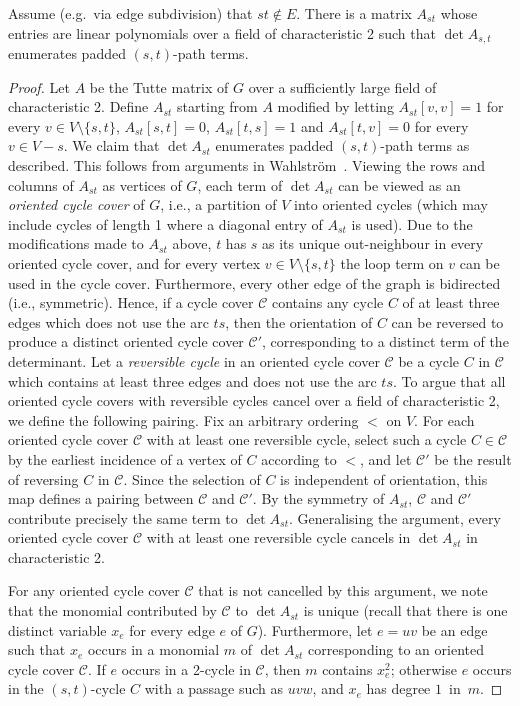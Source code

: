 \documentclass{theoretics}
\newcommand{\cC}{\ensuremath{\mathcal C}\xspace}
\begin{document}
\begin{lemma} \label{lemma:padded-st-paths}
  Assume (e.g.\ via edge subdivision) that $st \notin E$. 
  There is a matrix $A_{st}$ whose entries are linear polynomials
  over a field of characteristic 2 such
  that $\det A_{s,t}$ enumerates padded $(s,t)$-path terms.
\end{lemma}
\begin{proof}
  Let $A$ be the Tutte matrix of $G$ over a sufficiently large field
  of characteristic 2. Define $A_{st}$ starting from $A$ modified 
  by letting $A_{st}[v,v]=1$ for every
  $v \in V \setminus \{s,t\}$, $A_{st}[s,t]=0$, $A_{st}[t,s]=1$ and $A_{st}[t,v]=0$
  for every $v \in V-s$. We claim that $\det A_{st}$ enumerates padded
  $(s,t)$-path terms as described. This follows from arguments in
  Wahlstr\"om~\cite{Wahlstrom13STACS}. Viewing the rows and columns of
  $A_{st}$ as vertices of $G$, each term of $\det A_{st}$ can be
  viewed as an \emph{oriented cycle cover} of $G$, i.e., a partition
  of $V$ into oriented cycles (which may include cycles of length 1
  where a diagonal entry of $A_{st}$ is used). Due to the
  modifications made to $A_{st}$ above, $t$ has $s$ as its unique out-neighbour 
  in every oriented cycle cover, and for every vertex $v \in V \setminus \{s,t\}$
  the loop term on $v$ can be used in the cycle cover.
  Furthermore, every other edge of the graph is bidirected
  (i.e., symmetric). Hence, if a cycle cover $\cC$ contains any cycle
  $C$ of at least three edges which does not use the arc $ts$,
  then the orientation of $C$ can be reversed to produce a distinct
  oriented cycle cover $\cC'$, corresponding to a distinct term of the
  determinant. Let a \emph{reversible cycle} in
  an oriented cycle cover $\cC$ be a cycle $C$ in $\cC$ which contains
  at least three edges and does not use the arc $ts$. To argue that
  all oriented cycle covers with reversible cycles cancel over a field
  of characteristic 2, we define the following pairing. Fix an
  arbitrary ordering $<$ on $V$. For each oriented cycle cover $\cC$ with
  at least one reversible cycle, select such a cycle $C \in \cC$
  by the earliest incidence of a vertex of $C$ according to $<$,
  and let $\cC'$ be the result of reversing $C$ in $\cC$. Since
  the selection of $C$ is independent of orientation, this map defines
  a pairing between $\cC$ and $\cC'$. By the symmetry of $A_{st}$,
  $\cC$ and $\cC'$ contribute precisely the same term to $\det A_{st}$.
  Generalising the argument, every oriented cycle cover $\cC$ with at
  least one reversible cycle cancels in $\det A_{st}$ in
  characteristic 2. 

  For any oriented cycle cover $\cC$ that is not cancelled by this
  argument, we note that the monomial contributed by $\cC$ to $\det A_{st}$
  is unique (recall that there is one distinct variable $x_e$ for
  every edge $e$ of $G$). Furthermore, let $e=uv$ be an edge such that
  $x_e$ occurs in a monomial $m$ of $\det A_{st}$ corresponding to an
  oriented cycle cover $\cC$. If $e$ occurs in a 2-cycle in $\cC$,
  then $m$ contains $x_e^2$; otherwise $e$ occurs in the $(s,t)$-cycle $C$
  with a passage such as $uvw$, and $x_e$ has degree $1$~in~$m$. 
\end{proof}
\end{document}
